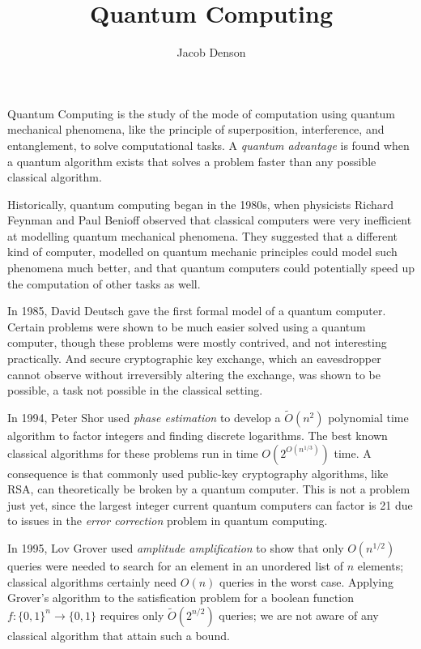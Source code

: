 


\title{Quantum Computing}
\author{Jacob Denson}



\maketitle
\tableofcontents
{}

Quantum Computing is the study of the mode of computation using quantum mechanical phenomena, like the principle of superposition, interference, and entanglement, to solve computational tasks. A \emph{quantum advantage} is found when a quantum algorithm exists that solves a problem faster than any possible classical algorithm.

Historically, quantum computing began in the 1980s, when physicists Richard Feynman and Paul Benioff observed that classical computers were very inefficient at modelling quantum mechanical phenomena. They suggested that a different kind of computer, modelled on quantum mechanic principles could model such phenomena much better, and that quantum computers could potentially speed up the computation of other tasks as well.

In 1985, David Deutsch gave the first formal model of a quantum computer. Certain problems were shown to be much easier solved using a quantum computer, though these problems were mostly contrived, and not interesting practically. And secure cryptographic key exchange, which an eavesdropper cannot observe without irreversibly altering the exchange, was shown to be possible, a task not possible in the classical setting.

In 1994, Peter Shor used \emph{phase estimation} to develop a $\tilde{O}(n^2)$ polynomial time algorithm to factor integers and finding discrete logarithms. The best known classical algorithms for these problems run in time $O(2^{O(n^{1/3})})$ time. A consequence is that commonly used public-key cryptography algorithms, like RSA, can theoretically be broken by a quantum computer. This is not a problem just yet, since the largest integer current quantum computers can factor is 21 due to issues in the \emph{error correction} problem in quantum computing.

In 1995, Lov Grover used \emph{amplitude amplification} to show that only $O(n^{1/2})$ queries were needed to search for an element in an unordered list of $n$ elements; classical algorithms certainly need $O(n)$ queries in the worst case. Applying Grover's algorithm to the satisfication problem for a boolean function $f: \{ 0,1 \}^n \to \{ 0, 1 \}$ requires only $\tilde{O}(2^{n/2})$ queries; we are not aware of any classical algorithm that attain such a bound.

